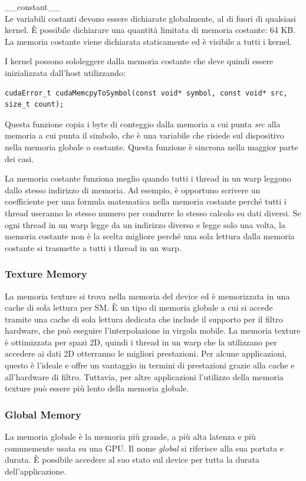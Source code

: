 \_\_constant\_\_ \\

Le variabili costanti devono essere dichiarate globalmente, al di fuori di qualsiasi kernel. È possibile dichiarare una quantità limitata di memoria costante: 64 KB. La memoria costante viene dichiarata staticamente ed è visibile a tutti i kernel.

I kernel possono sololeggere  dalla memoria costante che deve quindi essere inizializzata dall'host utilizzando:
\begin{lstlisting}[label=code:cudaMemcpyToSymbol_def]
cudaError_t cudaMemcpyToSymbol(const void* symbol, const void* src, size_t count);
\end{lstlisting}
Questa funzione copia i byte di conteggio dalla memoria a cui punta \emph{src} alla memoria a cui punta il simbolo, che è una variabile che risiede sul dispositivo nella memoria globale o costante. Questa funzione è sincrona nella maggior parte dei casi.

La memoria costante funziona meglio quando tutti i thread in un warp leggono dallo stesso indirizzo di memoria. Ad esempio, è opportuno scrivere un coefficiente per una formula matematica nella memoria costante perché tutti i thread useranno lo stesso numero per condurre lo stesso calcolo su dati diversi. Se ogni thread in un warp legge da un indirizzo diverso e legge solo una volta, la memoria costante non è la scelta migliore perché una sola lettura dalla memoria costante si trasmette a tutti i thread in un warp.

\subsubsection{Texture Memory}
La memoria texture si trova nella memoria del device ed è memorizzata in una cache di sola lettura per SM. È un tipo di memoria globale a cui si accede tramite una cache di sola lettura dedicata che include il supporto per il filtro hardware, che può eseguire l'interpolazione in virgola mobile. La memoria texture è ottimizzata per spazi 2D, quindi i thread in un warp che la utilizzano per accedere ai dati 2D otterranno le migliori prestazioni. Per alcune applicazioni, questo è l'ideale e offre un vantaggio in termini di prestazioni grazie alla cache e all'hardware di filtro. Tuttavia, per altre applicazioni l'utilizzo della memoria texture può essere più lento della memoria globale.

\subsubsection{Global Memory}
La memoria globale è la memoria più grande, a più alta latenza e più comunemente usata su una GPU. Il nome \emph{global} si riferisce alla sua portata e durata. È possibile accedere al suo stato sul device per tutta la durata dell'applicazione.


